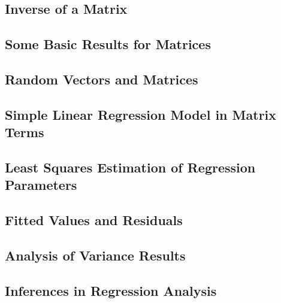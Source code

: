 \subsection{Inverse of a Matrix}

\subsection{Some Basic Results for Matrices}

\subsection{Random Vectors and Matrices}

\subsection{Simple Linear Regression Model in Matrix Terms}

\subsection{Least Squares Estimation of Regression Parameters}

\subsection{Fitted Values and Residuals}

\subsection{Analysis of Variance Results}

\subsection{Inferences in Regression Analysis}

